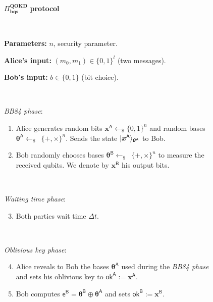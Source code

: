 \begin{figure}[h!]
    \centering
        \begin{tcolorbox}
            
            \centerline{$\Pi^{\textbf{QOKD}}_{\textbf{bqs}}$ \textbf{protocol}}
            
            \
            
            \textbf{Parameters:} $n$, security parameter.
            
            \textbf{Alice's input:} $(m_0, m_1)\in\{0,1\}^l$ (two messages). 
            
            \textbf{Bob's input:} $b\in\{0,1\}$ (bit choice).
            
            \
            
                        \textit{BB84 phase}:
            \begin{enumerate}
                \item Alice generates random bits $\bm{x}^{\mathsf{A}}\leftarrow_{\$}\{0,1\}^n$ and random bases $\bm{\theta}^{\mathsf{A}}\leftarrow_{\$}$~$\{+,\times\}^n$. Sends the state $| \bm{x}^{\mathsf{A}} \rangle_{\bm{\theta}^{\mathsf{A}}}$ to Bob.
                \item Bob randomly chooses bases $\bm{\theta}^{\mathsf{B}}\leftarrow_{\$}$~$\{+,\times\}^n$ to measure the received qubits. We denote by $\bm{x}^{\mathsf{B}}$ his output bits.
            \end{enumerate}
            
            \
            
			\textit{Waiting time phase}:
            \begin{enumerate}
            \setcounter{enumi}{2}
                \item Both parties wait time $\Delta t$.
            \end{enumerate}            
            
            \
            
            \textit{Oblivious key phase}:
            \begin{enumerate}
            \setcounter{enumi}{3}
                \item Alice reveals to Bob the bases $\bm{\theta}^{\mathsf{A}}$ used during the \textit{BB84 phase} and sets his oblivious key to $\mathsf{ok}^{\mathsf{A}}:=\bm{x}^{\mathsf{A}}$.
                \item Bob computes $\mathsf{e}^\mathsf{B} = \bm{\theta}^{\mathsf{B}} \oplus \bm{\theta}^{\mathsf{A}}$ and sets $\mathsf{ok}^{\mathsf{B}}:=\bm{x}^{\mathsf{B}}$.
            \end{enumerate}
            

\end{tcolorbox}
\end{figure}
